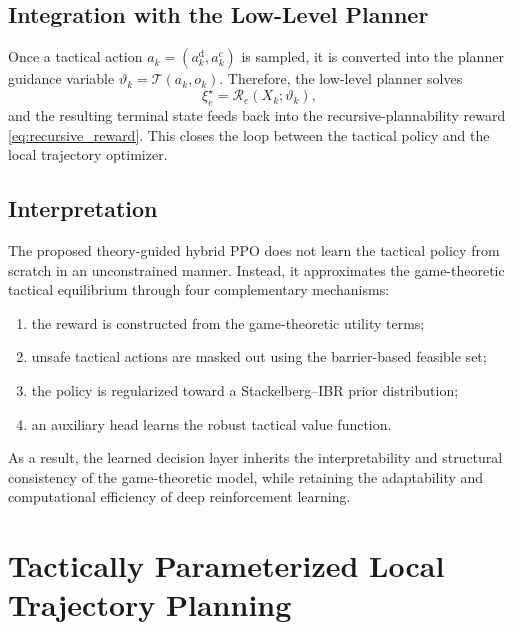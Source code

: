 \documentclass[final ,3p, times]{elsarticle}
\begin{document}
\subsection{Integration with the Low-Level Planner}
\label{subsec:integration_low_level}

Once a tactical action $a_k=(a_k^{\mathrm{d}},a_k^{\mathrm{c}})$ is sampled, it is converted into the planner guidance variable $\vartheta_k=\mathcal{T}(a_k,o_k)$. Therefore, the low-level planner solves
\begin{equation}
\xi_e^\star
=
\mathcal{R}_e(X_k;\vartheta_k),
\label{eq:planner_under_policy}
\end{equation}
and the resulting terminal state feeds back into the recursive-plannability reward \eqref{eq:recursive_reward}. This closes the loop between the tactical policy and the local trajectory optimizer.

\subsection{Interpretation}
\label{subsec:rl_interpretation}

The proposed theory-guided hybrid PPO does not learn the tactical policy from scratch in an unconstrained manner. Instead, it approximates the game-theoretic tactical equilibrium through four complementary mechanisms:
\begin{enumerate}
    \item the reward is constructed from the game-theoretic utility terms;
    \item unsafe tactical actions are masked out using the barrier-based feasible set;
    \item the policy is regularized toward a Stackelberg--IBR prior distribution;
    \item an auxiliary head learns the robust tactical value function.
\end{enumerate}

As a result, the learned decision layer inherits the interpretability and structural consistency of the game-theoretic model, while retaining the adaptability and computational efficiency of deep reinforcement learning.

\section{Tactically Parameterized Local Trajectory Planning}
\label{sec:tactical_parameterized_local_planning}
\end{document}
